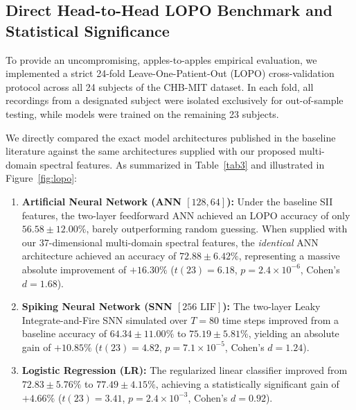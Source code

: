 \documentclass[pdflatex,sn-mathphys-num]{sn-jnl}
\begin{document}
\subsection{Direct Head-to-Head LOPO Benchmark and Statistical Significance}
To provide an uncompromising, apples-to-apples empirical evaluation, we implemented a strict 24-fold Leave-One-Patient-Out (LOPO) cross-validation protocol across all 24 subjects of the CHB-MIT dataset. In each fold, all recordings from a designated subject were isolated exclusively for out-of-sample testing, while models were trained on the remaining 23 subjects. 

We directly compared the exact model architectures published in the baseline literature against the same architectures supplied with our proposed multi-domain spectral features. As summarized in Table~\ref{tab3} and illustrated in Figure~\ref{fig:lopo}:
\begin{enumerate}
    \item \textbf{Artificial Neural Network (ANN $[128, 64]$):} Under the baseline SII features, the two-layer feedforward ANN achieved an LOPO accuracy of only $56.58 \pm 12.00\%$, barely outperforming random guessing. When supplied with our 37-dimensional multi-domain spectral features, the \textit{identical} ANN architecture achieved an accuracy of \textbf{$72.88 \pm 6.42\%$}, representing a massive absolute improvement of \textbf{$+16.30\%$} ($t(23) = 6.18$, $p = 2.4 \times 10^{-6}$, Cohen's $d = 1.68$).
    \item \textbf{Spiking Neural Network (SNN $[256\text{ LIF}]$):} The two-layer Leaky Integrate-and-Fire SNN simulated over $T=80$ time steps improved from a baseline accuracy of $64.34 \pm 11.00\%$ to \textbf{$75.19 \pm 5.81\%$}, yielding an absolute gain of \textbf{$+10.85\%$} ($t(23) = 4.82$, $p = 7.1 \times 10^{-5}$, Cohen's $d = 1.24$).
    \item \textbf{Logistic Regression (LR):} The regularized linear classifier improved from $72.83 \pm 5.76\%$ to \textbf{$77.49 \pm 4.15\%$}, achieving a statistically significant gain of \textbf{$+4.66\%$} ($t(23) = 3.41$, $p = 2.4 \times 10^{-3}$, Cohen's $d = 0.92$).
\end{enumerate}
\end{document}
